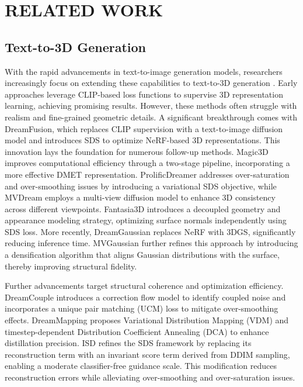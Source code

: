 \section{RELATED WORK}
\label{2}
\subsection{Text-to-3D Generation}\label{2.1}
With the rapid advancements in text-to-image generation models, researchers increasingly focus on extending these capabilities to text-to-3D generation \cite{magic3d,prod, mvdream,mvgaussian}. Early approaches \cite{avatarclip,clipmesh,clipforge} leverage CLIP-based loss functions to supervise 3D representation learning, achieving promising results. However, these methods often struggle with realism and fine-grained geometric details. A significant breakthrough comes with DreamFusion\cite{dreamfusion}, which replaces CLIP supervision with a text-to-image diffusion model and introduces SDS to optimize NeRF-based 3D representations. This innovation lays the foundation for numerous follow-up methods.
Magic3D \cite{magic3d} improves computational efficiency through a two-stage pipeline, incorporating a more effective DMET \cite{dmtet} representation. ProlificDreamer \cite{prod} addresses over-saturation and over-smoothing issues by introducing a variational SDS objective, while MVDream \cite{mvdream} employs a multi-view diffusion model to enhance 3D consistency across different viewpoints. Fantasia3D \cite{fantasia3d} introduces a decoupled geometry and appearance modeling strategy, optimizing surface normals independently using SDS loss. More recently, DreamGaussian \cite{dreamgaussian} replaces NeRF with 3DGS, significantly reducing inference time. MVGaussian \cite{mvgaussian} further refines this approach by introducing a densification algorithm that aligns Gaussian distributions with the surface, thereby improving structural fidelity.

Further advancements target structural coherence and optimization efficiency. DreamCouple \cite{dreamcouple} introduces a correction flow model to identify coupled noise and incorporates a unique pair matching (UCM) loss to mitigate over-smoothing effects. DreamMapping \cite{dreammapping} proposes Variational Distribution Mapping (VDM) and timestep-dependent Distribution Coefficient Annealing (DCA) to enhance distillation precision. ISD refines the SDS framework by replacing its reconstruction term with an invariant score term derived from DDIM sampling, enabling a moderate classifier-free guidance scale. This modification reduces reconstruction errors while alleviating over-smoothing and over-saturation issues.

